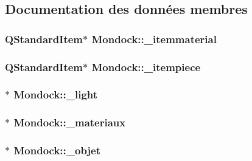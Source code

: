 \subsection{Documentation des données membres}
\hypertarget{class_mondock_ab873f19cf3a771dcb0f32480e3ea2c69}{
\subsubsection[{\+\_\+itemmaterial}]{\setlength{\rightskip}{0pt plus 5cm}Q\+Standard\+Item$\ast$ Mondock\+::\+\_\+itemmaterial}}\label{class_mondock_ab873f19cf3a771dcb0f32480e3ea2c69}
\hypertarget{class_mondock_a3de76b6bfaee199ee945f04c3c2f4c02}{
\subsubsection[{\+\_\+itempiece}]{\setlength{\rightskip}{0pt plus 5cm}Q\+Standard\+Item$\ast$ Mondock\+::\+\_\+itempiece}}\label{class_mondock_a3de76b6bfaee199ee945f04c3c2f4c02}
\hypertarget{class_mondock_a541a241aadaf9820926b427f2d504573}{
\subsubsection[{\+\_\+light}]{$\ast$ Mondock\+::\+\_\+light}}\label{class_mondock_a541a241aadaf9820926b427f2d504573}
\hypertarget{class_mondock_ada15f5ec6dabb8728651472f5cc867a8}{
\subsubsection[{\+\_\+materiaux}]{$\ast$ Mondock\+::\+\_\+materiaux}}\label{class_mondock_ada15f5ec6dabb8728651472f5cc867a8}
\hypertarget{class_mondock_a6325a3fb92643c99815b1a8025f7d401}{
\subsubsection[{\+\_\+objet}]{$\ast$ Mondock\+::\+\_\+objet}}\label{class_mondock_a6325a3fb92643c99815b1a8025f7d401}
